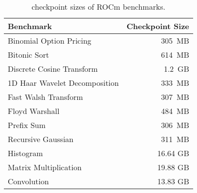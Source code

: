 \begin{table}[t]
\centering
\begin{tabular}{lr}
\toprule
\textbf{Benchmark} & \textbf{Checkpoint Size}
\\ \midrule
Binomial Option Pricing       & 305~MB \\
Bitonic Sort                  & 614~MB \\
Discrete Cosine Transform     & 1.2~GB \\
1D Haar Wavelet Decomposition & 333~MB \\
Fast Walsh Transform          & 307~MB \\
Floyd Warshall                & 484~MB \\
Prefix Sum                    & 306~MB \\
Recursive Gaussian            & 311~MB \\
Histogram                     & 16.64 GB \\
Matrix Multiplication         & 19.88 GB \\
Convolution                   & 13.83 GB \\
\bottomrule
\end{tabular}
\caption{\sys checkpoint sizes of ROCm benchmarks.}
\label{tab:rocm-benchmark-checkpoints}
\vspace{-1em}
\end{table}
